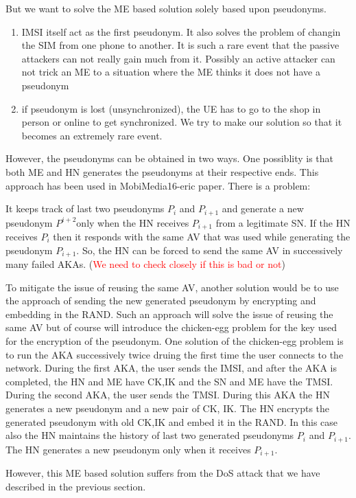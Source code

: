 \documentclass[runningheads,a4paper]{llncs} %
\begin{document}
But we want to solve the ME based solution solely based upon pseudonyms. 

\begin{enumerate}
\item IMSI itself act as the first pseudonym. It also solves the problem of changin the SIM from one phone to another. It is such a rare event that the passive attackers can not really gain much from it. Possibly an active attacker can not trick an ME to  a situation where the ME thinks it does not have a pseudonym
\item if pseudonym is lost (unsynchronized), the UE has to go to the shop in person or online to get synchronized. We try to make our solution so that it becomes an extremely rare event.
\end{enumerate}

However, the pseudonyms can be obtained in two ways. One possiblity is that both ME and HN generates the pseudonyms at their respective ends. This approach has been used in MobiMedia16-eric paper. There is a problem:


It keeps track of last two pseudonyms $P_{i}$ and $P_{i+1}$ and generate a new pseudonym $P^{i+2} $only when the HN receives $P_{i+1}$ from a legitimate SN. If the HN receives $P_{i}$ then it responds with the same AV that was used while generating the pseudonym $P_{i+1}$. So, the HN can be forced to send the same AV in successively many failed AKAs. (\textcolor{red}{We need to check closely if this is bad or not})

To mitigate the issue of reusing the same AV, another solution would be to use the approach of sending the new generated pseudonym by encrypting and embedding in the RAND. Such an approach will solve the issue of reusing the same AV but of course will introduce the chicken-egg problem for the key used for the encryption of the pseudonym. One solution of the chicken-egg problem is to run the AKA successively twice druing the first time the user connects to the network. During the first AKA, the user sends the IMSI, and after the AKA is completed, the HN and ME have CK,IK and the SN and ME have the TMSI. During the second AKA, the user sends the TMSI. During this AKA the HN generates a new pseudonym and a new pair of CK, IK. The HN encrypts the generated pseudonym with old CK,IK and embed it in the RAND. In this case also the HN maintains the history of last two generated pseudonyms $P_{i}$ and $P_{i+1}$. The HN generates a new pseudonym only when it receives $P_{i+1}$. 

However, this ME based solution suffers from the DoS attack that we have described in the previous section.
\end{document}

